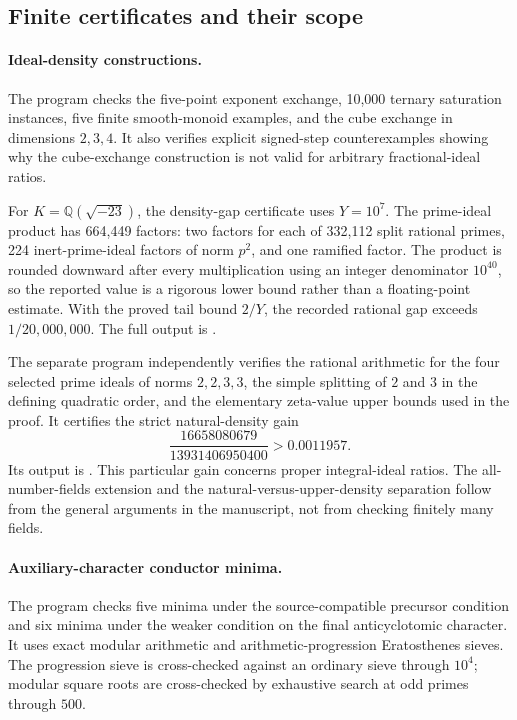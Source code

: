 \subsection{Finite certificates and their scope}

\paragraph{Ideal-density constructions.}
The program  checks the
five-point exponent exchange, 10,000 ternary saturation instances,
five finite smooth-monoid examples, and the cube exchange in
dimensions \(2,3,4\). It also verifies explicit signed-step
counterexamples showing why the cube-exchange construction is not
valid for arbitrary fractional-ideal ratios.

For \(K=\mathbb Q(\sqrt{-23})\), the density-gap certificate uses
\(Y=10^7\). The prime-ideal product has 664,449 factors: two factors
for each of 332,112 split rational primes, 224 inert-prime-ideal
factors of norm \(p^2\), and one ramified factor. The product is
rounded downward after every multiplication using an integer
denominator \(10^{40}\), so the reported value is a rigorous lower
bound rather than a floating-point estimate. With the proved tail
bound \(2/Y\), the recorded rational gap exceeds \(1/20{,}000{,}000\).
The full output is .

The separate program 
independently verifies the rational arithmetic for the four selected
prime ideals of norms \(2,2,3,3\), the simple splitting of \(2\) and
\(3\) in the defining quadratic order, and the elementary zeta-value
upper bounds used in the proof. It certifies the strict natural-density
gain
\[
 \frac{16658080679}{13931406950400}>0.0011957.
\]
Its output is .
This particular gain concerns proper integral-ideal ratios.
The all-number-fields extension and the natural-versus-upper-density
separation follow from the general arguments in the manuscript,
not from checking finitely many fields.

\paragraph{Auxiliary-character conductor minima.}
The program  checks five minima
under the source-compatible precursor condition and six minima
under the weaker condition on the final anticyclotomic character.
It uses exact modular arithmetic and arithmetic-progression
Eratosthenes sieves. The progression sieve is cross-checked against
an ordinary sieve through \(10^4\); modular square roots are
cross-checked by exhaustive search at odd primes through \(500\).

